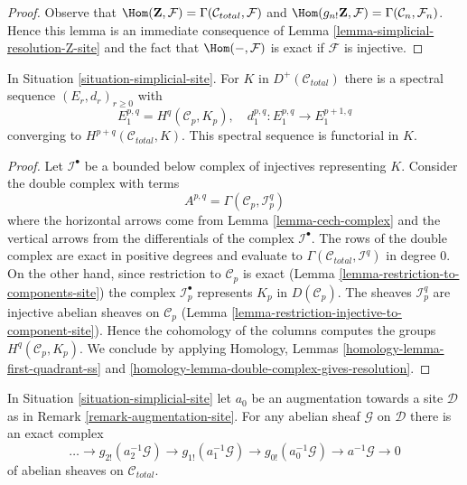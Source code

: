 \begin{proof}
Observe that
$\Hom(\mathbf{Z}, \mathcal{F}) = \Gamma(\mathcal{C}_{total}, \mathcal{F})$
and
$\Hom(g_{n!}\mathbf{Z}, \mathcal{F}) = \Gamma(\mathcal{C}_n, \mathcal{F}_n)$.
Hence this lemma is an immediate consequence of
Lemma \ref{lemma-simplicial-resolution-Z-site}
and the fact that $\Hom(-, \mathcal{F})$ is exact if
$\mathcal{F}$ is injective.
\end{proof}

\begin{lemma}
\label{lemma-simplicial-sheaf-cohomology-site}
In Situation \ref{situation-simplicial-site}. For $K$ in
$D^+(\mathcal{C}_{total})$ there is a spectral sequence
$(E_r, d_r)_{r \geq 0}$ with
$$
E_1^{p, q} = H^q(\mathcal{C}_p, K_p),\quad
d_1^{p, q} : E_1^{p, q} \to E_1^{p + 1, q}
$$
converging to $H^{p + q}(\mathcal{C}_{total}, K)$.
This spectral sequence is functorial in $K$.
\end{lemma}

\begin{proof}
Let $\mathcal{I}^\bullet$ be a bounded below complex of injectives
representing $K$. Consider the double complex with terms
$$
A^{p, q} = \Gamma(\mathcal{C}_p, \mathcal{I}^q_p)
$$
where the horizontal arrows come from Lemma \ref{lemma-cech-complex}
and the vertical arrows from the differentials of the
complex $\mathcal{I}^\bullet$. The rows of the double complex are exact
in positive degrees and evaluate to
$\Gamma(\mathcal{C}_{total}, \mathcal{I}^q)$ in degree $0$.
On the other hand, since restriction to $\mathcal{C}_p$ is exact
(Lemma \ref{lemma-restriction-to-components-site})
the complex $\mathcal{I}_p^\bullet$ represents $K_p$ in
$D(\mathcal{C}_p)$. The sheaves $\mathcal{I}_p^q$ are injective
abelian sheaves on $\mathcal{C}_p$
(Lemma \ref{lemma-restriction-injective-to-component-site}).
Hence the cohomology of the columns computes the groups
$H^q(\mathcal{C}_p, K_p)$. We conclude by applying
Homology, Lemmas \ref{homology-lemma-first-quadrant-ss} and
\ref{homology-lemma-double-complex-gives-resolution}.
\end{proof}

\begin{lemma}
\label{lemma-simplicial-resolution-augmentation}
In Situation \ref{situation-simplicial-site} let
$a_0$ be an augmentation towards a site $\mathcal{D}$
as in Remark \ref{remark-augmentation-site}.
For any abelian sheaf $\mathcal{G}$ on $\mathcal{D}$ 
there is an exact complex
$$
\ldots \to
g_{2!}(a_2^{-1}\mathcal{G}) \to
g_{1!}(a_1^{-1}\mathcal{G}) \to
g_{0!}(a_0^{-1}\mathcal{G}) \to
a^{-1}\mathcal{G} \to 0
$$
of abelian sheaves on $\mathcal{C}_{total}$.
\end{lemma}


